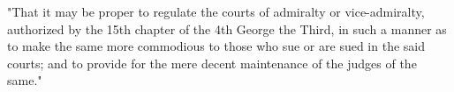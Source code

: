 "That it may be proper to regulate the courts of admiralty or vice-admiralty, authorized by the 15th chapter of the 4th George the Third, in such a manner as to make the same more commodious to those who sue or are sued in the said courts; and to provide for the mere decent maintenance of the judges of the same."











